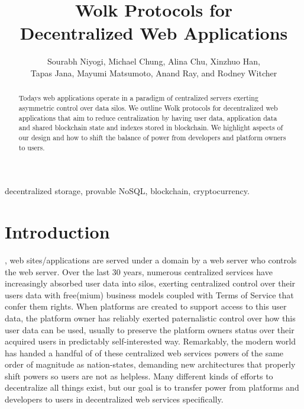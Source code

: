\documentclass[journal]{IEEEtran}
\begin{document}
\title{Wolk Protocols for\\ Decentralized Web Applications}
\author{Sourabh Niyogi, Michael Chung, Alina Chu, Xinzhuo Han, \\
Tapas Jana, Mayumi Matsumoto, Anand Ray, and Rodney Witcher}

\maketitle

\begin{abstract}
Todays web applications operate in a paradigm of centralized servers exerting asymmetric control over  data silos.  We outline Wolk protocols for decentralized web applications that aim to reduce centralization by having user data, application data and shared blockchain state and indexes stored in blockchain.  We highlight aspects of our design and how to shift the balance of power from developers and platform owners to users.
\end{abstract}

\begin{IEEEkeywords}
decentralized storage, provable NoSQL, blockchain, cryptocurrency.
\end{IEEEkeywords}

\IEEEpeerreviewmaketitle

\section{Introduction}
, web sites/applications are served under a domain by a web server who controls the web server.  Over the last 30 years, numerous centralized services have increasingly absorbed user data into silos, exerting centralized control over their users data with free(mium) business models coupled with Terms of Service that confer them rights.  When platforms are created to support access to this user data, the platform owner has reliably exerted paternalistic control over how this user data can be used, usually to preserve the platform owners status over their acquired users in predictably self-interested way.  Remarkably, the modern world has handed a handful of of these centralized web services powers of the same order of magnitude as nation-states, demanding new architectures that properly shift powers so users are not as helpless.  Many different kinds of efforts to decentralize all things exist, but our goal is to transfer power from platforms and developers to users in decentralized web services specifically.
\end{document}
